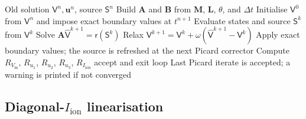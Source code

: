 \documentclass[11pt,a4paper]{article}
\newcommand{\Vm}{V_{\text{m}}}
\newcommand{\Iion}{I_{\mathrm{ion}}}
\newcommand{\Mmass}{\mathbf{M}}
\newcommand{\Lop}{\mathbf{L}}
\newcommand{\Aimp}{\mathbf{A}}
\newcommand{\Bimp}{\mathbf{B}}
\begin{document}
\begin{algorithm}[h!]
\caption{Picard nonlinear coupling}
\label{alg:picard}
\begin{algorithmic}[1]
\Require Old solution $\mathsf{V}^n,\mathbf{u}^n$, source $\mathsf{S}^n$
\State Build $\Aimp$ and $\Bimp$ from $\Mmass$, $\Lop$, $\theta$, and $\Delta t$
\State Initialise $\mathsf{V}^0$ from $\mathsf{V}^n$ and impose exact boundary values at $t^{n+1}$
  \State Evaluate states and source $\mathsf{S}^k$ from $\mathsf{V}^{k}$
  \State Solve $\Aimp\widehat{\mathsf{V}}^{k+1}=\mathsf{r}(\mathsf{S}^k)$
  \State Relax $\mathsf{V}^{k+1}=\mathsf{V}^{k}+\omega(\widehat{\mathsf{V}}^{k+1}-\mathsf{V}^{k})$
  \State Apply exact boundary values; the source is refreshed at the next Picard corrector
  \State Compute $R_{\Vm}$, $R_{u_1}$, $R_{u_2}$, $R_{u_3}$, $R_{\Iion}$
    \State accept and exit loop
  \EndIf
\EndFor
\Ensure Last Picard iterate is accepted; a warning is printed if not converged
\end{algorithmic}
\end{algorithm}

\subsection{Diagonal-\texorpdfstring{$\Iion$}{Iion} linearisation}
\label{sec:diagonal}
\end{document}
